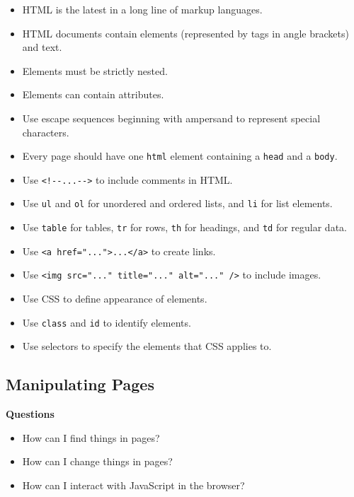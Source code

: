 \begin{itemize}
\tightlist
\item
  HTML is the latest in a long line of markup languages.
\item
  HTML documents contain elements (represented by tags in angle
  brackets) and text.
\item
  Elements must be strictly nested.
\item
  Elements can contain attributes.
\item
  Use escape sequences beginning with ampersand to represent special
  characters.
\item
  Every page should have one \texttt{html} element containing a
  \texttt{head} and a \texttt{body}.
\item
  Use \texttt{\textless{}!-\/-...-\/-\textgreater{}} to include comments
  in HTML.
\item
  Use \texttt{ul} and \texttt{ol} for unordered and ordered lists, and
  \texttt{li} for list elements.
\item
  Use \texttt{table} for tables, \texttt{tr} for rows, \texttt{th} for
  headings, and \texttt{td} for regular data.
\item
  Use
  \texttt{\textless{}a\ href="..."\textgreater{}...\textless{}/a\textgreater{}}
  to create links.
\item
  Use
  \texttt{\textless{}img\ src="..."\ title="..."\ alt="..."\ /\textgreater{}}
  to include images.
\item
  Use CSS to define appearance of elements.
\item
  Use \texttt{class} and \texttt{id} to identify elements.
\item
  Use selectors to specify the elements that CSS applies to.
\end{itemize}

\hypertarget{s:pages}{\subsection{Manipulating Pages}\label{s:pages}}

\textbf{Questions}

\begin{itemize}
\tightlist
\item
  How can I find things in pages?
\item
  How can I change things in pages?
\item
  How can I interact with JavaScript in the browser?
\end{itemize}

